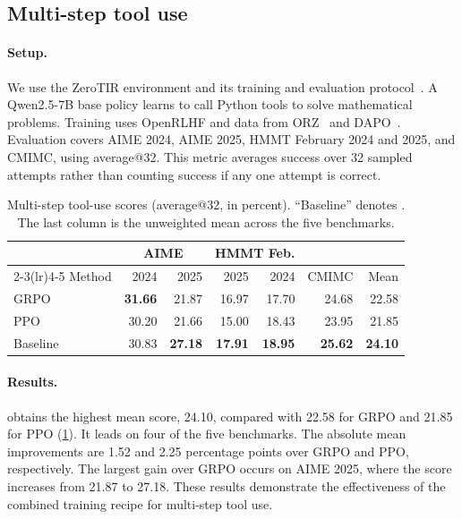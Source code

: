 \FloatBarrier
\subsection{Multi-step tool use}\label{sec:tools}
\paragraph{Setup.}
We use the ZeroTIR environment and its training and evaluation protocol~\citep{mai2025agentrlscalinglaw}. A Qwen2.5-7B base policy learns to call Python tools to solve mathematical problems. Training uses OpenRLHF and data from ORZ~\citep{hu2025openreasonerzeroopensourceapproach} and DAPO~\citep{yu2025dapoopensourcellmreinforcement}. Evaluation covers AIME 2024, AIME 2025, HMMT February 2024 and 2025, and CMIMC, using average@32. This metric averages success over 32 sampled attempts rather than counting success if any one attempt is correct.

\begin{table}[htbp]
\caption{Multi-step tool-use scores (average@32, in percent). ``Baseline'' denotes \baseline. The last column is the unweighted mean across the five benchmarks.}
\label{tab:tools}
\centering
\small
\begin{tabular}{lrrrrrr}
\toprule
 & \multicolumn{2}{c}{AIME} & \multicolumn{2}{c}{HMMT Feb.} & & \\
\cmidrule(lr){2-3}\cmidrule(lr){4-5}
Method & 2024 & 2025 & 2025 & 2024 & CMIMC & Mean \\
\midrule
GRPO & \textbf{31.66} & 21.87 & 16.97 & 17.70 & 24.68 & 22.58 \\
PPO & 30.20 & 21.66 & 15.00 & 18.43 & 23.95 & 21.85 \\
Baseline & 30.83 & \textbf{27.18} & \textbf{17.91} & \textbf{18.95} & \textbf{25.62} & \textbf{24.10} \\
\bottomrule
\end{tabular}
\end{table}

\paragraph{Results.}
\baseline obtains the highest mean score, 24.10, compared with 22.58 for GRPO and 21.85 for PPO (\cref{tab:tools}). It leads on four of the five benchmarks. The absolute mean improvements are 1.52 and 2.25 percentage points over GRPO and PPO, respectively. The largest gain over GRPO occurs on AIME 2025, where the score increases from 21.87 to 27.18. These results demonstrate the effectiveness of the combined training recipe for multi-step tool use.
